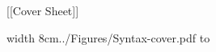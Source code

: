 
[[Cover Sheet]]

\pdfximage width 8cm{../Figures/Syntax-cover.pdf}
\smallskip\noindent
\hbox to\hsize{\pdfrefximage \pdflastximage\hfill}
\smallskip


\noindent{\it
}
\vfill\eject
